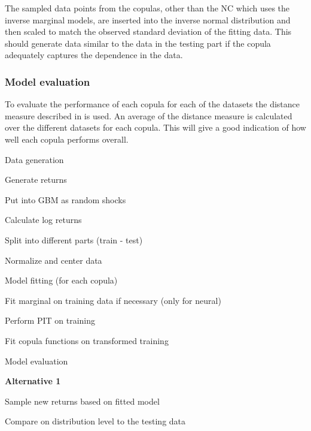 The sampled data points from the copulas, other than the \gls{NC} which uses the inverse marginal models, are inserted into the inverse normal distribution and then scaled to match the observed standard deviation of the fitting data. This should generate data similar to the data in the testing part if the copula adequately captures the dependence in the data.

\subsubsection{Model evaluation}
To evaluate the performance of each copula for each of the datasets the distance measure described in  is used. An average of the distance measure is calculated over the different datasets for each copula. This will give a good indication of how well each copula performs overall. 


\begin{generalinstructions}
    \begin{compactenum}
        \item Data generation
        \begin{compactenum}
            \item Generate returns
            \item Put into GBM as random shocks 
            \item Calculate log returns 
            \item Split into different parts (train - test)
            \item Normalize and center data
        \end{compactenum}
        \item Model fitting (for each copula)
        \begin{compactenum}
            \item Fit marginal on training data if necessary (only for neural) 
            \item Perform PIT on training
            \item Fit copula functions on transformed training
        \end{compactenum}
        \item Model evaluation
        
        \textbf{Alternative 1}
        \begin{compactenum}
            \item Sample new returns based on fitted model
            \item Compare on distribution level to the testing data
        \end{compactenum}
    \end{compactenum}
\end{generalinstructions}

